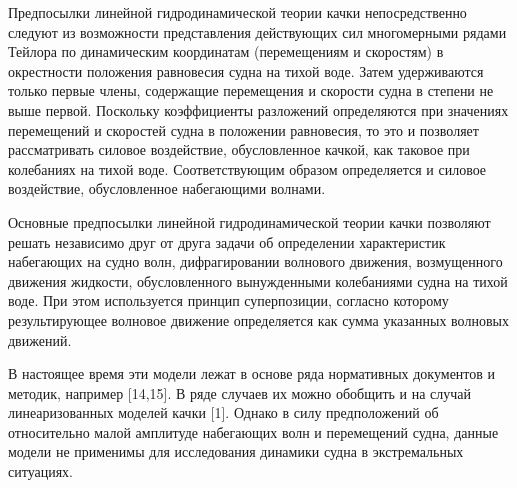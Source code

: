 Предпосылки линейной гидродинамической теории качки непосредственно следуют из возможности представления действующих сил многомерными рядами Тейлора по динамическим координатам (перемещениям и скоростям) в окрестности положения равновесия судна на тихой воде. Затем удерживаются только первые члены, содержащие перемещения и скорости судна в степени не выше первой. Поскольку коэффициенты разложений определяются при значениях перемещений и скоростей судна в положении равновесия, то это и позволяет рассматривать силовое воздействие, обусловленное качкой, как таковое при колебаниях на тихой воде. Соответствующим образом определяется и силовое воздействие, обусловленное набегающими волнами.

Основные предпосылки линейной гидродинамической теории качки позволяют решать независимо друг от друга задачи об определении характеристик набегающих на судно волн, дифрагировании волнового движения, возмущенного движения жидкости, обусловленного вынужденными колебаниями судна на тихой воде. При этом используется принцип суперпозиции, согласно которому результирующее волновое движение определяется как сумма указанных волновых движений. 

В настоящее время эти модели лежат в основе ряда нормативных документов и методик, например [14,15]. В ряде случаев их можно обобщить и на случай линеаризованных моделей качки [1]. Однако в силу предположений об относительно малой амплитуде набегающих волн и перемещений судна, данные модели не применимы для исследования динамики судна в экстремальных ситуациях.


